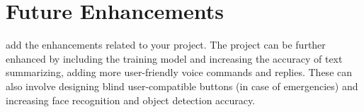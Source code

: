 \chapter{Future Enhancements}
\thispagestyle{special}
add the enhancements related to your project. The project can be further enhanced by including the training model and increasing the accuracy of text summarizing, adding more user-friendly voice commands and replies. These can also involve designing blind user-compatible buttons (in case of emergencies) and increasing face recognition and object detection accuracy.